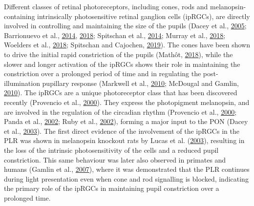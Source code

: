 \documentclass[
]{article}
\begin{document}
Different classes of retinal photoreceptors, including cones, rods and melanopsin-containing intrinsically photosensitive retinal ganglion cells (ipRGCs), are directly involved in controlling and maintaining the size of the pupils (Dacey et al., \protect\hyperlink{ref-Dacey2005}{2005}; Barrionuevo et al., \protect\hyperlink{ref-Barrionuevo2014}{2014}, \protect\hyperlink{ref-Barrionuevo2018}{2018}; Spitschan et al., \protect\hyperlink{ref-Spitschan2014}{2014}; Murray et al., \protect\hyperlink{ref-Murray2018}{2018}; Woelders et al., \protect\hyperlink{ref-Woelders2018}{2018}; Spitschan and Cajochen, \protect\hyperlink{ref-Spitschan2019}{2019}). The cones have been shown to drive the initial rapid constriction of the pupils (Mathôt, \protect\hyperlink{ref-Mathot2018}{2018}), while the slower and longer activation of the ipRGCs shows their role in maintaining the constriction over a prolonged period of time and in regulating the post-illumination pupillary response (Markwell et al., \protect\hyperlink{ref-Markwell2010}{2010}; McDougal and Gamlin, \protect\hyperlink{ref-McDougal2010}{2010}). The ipRGCs are a unique photoreceptor class that has been discovered recently (Provencio et al., \protect\hyperlink{ref-Provencio2000}{2000}). They express the photopigment melanopsin, and are involved in the regulation of the circadian rhythm (Provencio et al., \protect\hyperlink{ref-Provencio2000}{2000}; Panda et al., \protect\hyperlink{ref-Panda2002}{2002}; Ruby et al., \protect\hyperlink{ref-Ruby2002}{2002}), forming a major input to the PON (Dacey et al., \protect\hyperlink{ref-Dacey2003}{2003}). The first direct evidence of the involvement of the ipRGCs in the PLR was shown in melanopsin knockout rats by Lucas et al. (\protect\hyperlink{ref-Lucas2003}{2003}), resulting in the loss of the intrinsic photosensitivity of the cells and a reduced pupil constriction. This same behaviour was later also observed in primates and humans (Gamlin et al., \protect\hyperlink{ref-Gamlin2007}{2007}), where it was demonstrated that the PLR continues during light presentation even when cone and rod signalling is blocked, indicating the primary role of the ipRGCs in maintaining pupil constriction over a prolonged time.
\end{document}

